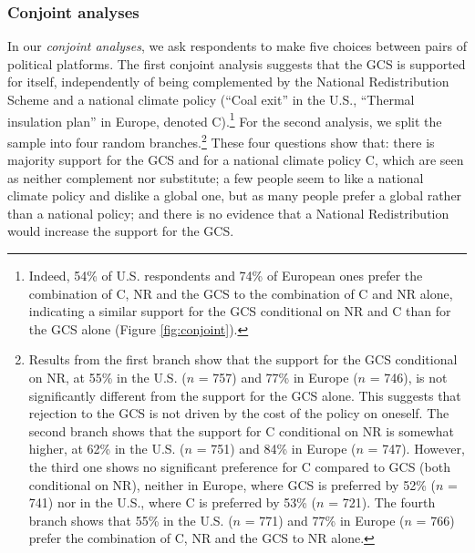 \subsubsection{Conjoint analyses}\label{subsubsec:conjoint} %
In our \textit{conjoint analyses}, we ask respondents to make five choices between pairs of political platforms. The first conjoint analysis suggests that the GCS is supported for itself, independently of being complemented by the National Redistribution Scheme and a national climate policy (``Coal exit'' in the U.S., ``Thermal insulation plan'' in Europe, denoted C).\footnote{Indeed, 54\% of %
U.S. respondents and 74\% of %
European ones prefer the combination of C, NR and the GCS to the combination of C and NR alone, indicating a similar support for the GCS conditional on NR and C than for the GCS alone (Figure \ref{fig:conjoint}).} %
For the second analysis, we split the sample into four random branches.\footnote{Results from the first branch show that the support for the GCS conditional on NR, at 55\% in the U.S. ($n$ = 757) and 77\% in Europe ($n$ = 746), is not significantly different from the support for the GCS alone. This suggests that rejection to the GCS is not driven by the cost of the policy on oneself. The second branch shows that the support for C conditional on NR is somewhat higher, at 62\% in the U.S. ($n$ = 751) and 84\% in Europe ($n$ = 747). However, the third one shows no significant preference for C compared to GCS (both conditional on NR), neither in Europe, where GCS is preferred by 52\% ($n$ = 741) nor in the U.S., where C is preferred by 53\% ($n$ = 721). The fourth branch shows that 55\% in the U.S. ($n$ = 771) and 77\% in Europe ($n$ = 766) prefer the combination of C, NR and the GCS to NR alone.} %
These four questions show that: there is majority support for the GCS and for a national climate policy C, which are seen as neither complement nor substitute; a few people seem to like a national climate policy and dislike a global one, but as many people prefer a global rather than a national policy; and there is no evidence that a National Redistribution would increase the support for the GCS. %

